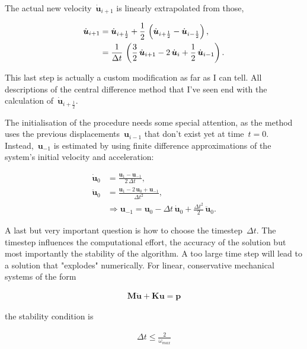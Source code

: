 The actual new velocity~$\dot{\boldsymbol{u}}_{i+1}$ is linearly extrapolated from those,

\begin{align}
\dot{\boldsymbol{u}}_{i+1} &= \dot{\boldsymbol{u}}_{i+\frac{1}{2}} + \frac{1}{2}\,\left(\dot{\boldsymbol{u}}_{i+\frac{1}{2}} - \dot{\boldsymbol{u}}_{i-\frac{1}{2}}\right),\notag\\
&= \frac{1}{\Delta t}\,\left(\frac{3}{2}\,\dot{\boldsymbol{u}}_{i+1} - 2\,\dot{\boldsymbol{u}}_{i} + \frac{1}{2}\,\dot{\boldsymbol{u}}_{i-1}\right).
\end{align}

This last step is actually a custom modification as far as I can tell.
All descriptions of the central difference method that I've seen end with the calculation of~$\dot{\boldsymbol{u}}_{i+\frac{1}{2}}$.

The initialisation of the procedure needs some special attention, as the method uses the previous displacements~$\boldsymbol{u}_{i-1}$ that don't exist yet at time~$t = 0$.
Instead,~$\boldsymbol{u}_{-1}$ is estimated by using finite difference approximations of the system's initial velocity and acceleration:

\begin{align}
\dot{\boldsymbol{u}}_0 &= \frac{\boldsymbol{u}_{1} - \boldsymbol{u}_{-1}}{2\,\Delta t},\\
\ddot{\boldsymbol{u}}_0 &= \frac{\boldsymbol{u}_{1} - 2\,\boldsymbol{u}_{0} + \boldsymbol{u}_{-1}}{\Delta t^2},\\
&\Rightarrow \boldsymbol{u}_{-1} = \boldsymbol{u}_{0} - \Delta t\,\dot{\boldsymbol{u}}_{0} + \frac{\Delta t^2}{2}\,\ddot{\boldsymbol{u}}_{0}.
\end{align}

A last but very important question is how to choose the timestep~$\Delta t$.
The timestep influences the computational effort, the accuracy of the solution but most importantly the stability of the algorithm.
A too large time step will lead to a solution that "explodes" numerically.
For linear, conservative mechanical systems of the form

\begin{align}
\boldsymbol{M}\ddot{\boldsymbol{u}} + \boldsymbol{K}\boldsymbol{u} = \boldsymbol{p}
\end{align}

the stability condition is

\begin{align}
\Delta t \le \frac{2}{\omega_{max}}\label{eq:timestep_bound}
\end{align}

